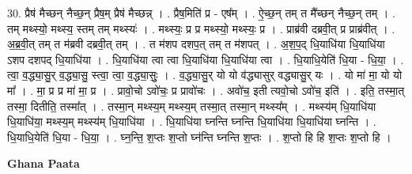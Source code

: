 \documentclass[17pt]{extarticle}
\begin{document}
30. प्रैष॑ मैच्छन् नैच्छ॒न् प्रैष॒म् प्रैष॑ मैच्छन्न् । . प्रैष॒मिति॑ प्र - एष᳚म् । . ऐ॒च्छ॒न् तम् त मै᳚च्छन् नैच्छ॒न् तम् । . तम् मथ्स्यो॒ मथ्स्य॒ स्तम् तम् मथ्स्यः॑ । . मथ्स्यः॒ प्र प्र मथ्स्यो॒ मथ्स्यः॒ प्र । . प्राब्र॑वी दब्रवी॒त् प्र प्राब्र॑वीत् । . अ॒ब्र॒वी॒त् तम् त म॑ब्रवी दब्रवी॒त् तम् । . त म॑शप दशप॒त् तम् त म॑शपत् । . अ॒श॒प॒द् धि॒याधि॑या धि॒याधि॑या ऽशप दशपद् धि॒याधि॑या । . धि॒याधि॑या त्वा त्वा धि॒याधि॑या धि॒याधि॑या त्वा । . धि॒याधि॒येति॑ धि॒या - धि॒या॒ । . त्वा॒ व॒द्ध्या॒सु॒र् व॒द्ध्या॒सु॒ स्त्वा॒ त्वा॒ व॒द्ध्या॒सुः॒ । . व॒द्ध्या॒सु॒र् यो यो व॑द्ध्यासुर् वद्ध्यासु॒र् यः । . यो मा॑ मा॒ यो यो मा᳚ । . मा॒ प्र प्र मा॑ मा॒ प्र । . प्रावो॒चो ऽवो॑चः॒ प्र प्रावो॑चः । . अवो॑च॒ इती त्यवो॒चो ऽवो॑च॒ इति॑ । . इति॒ तस्मा॒त् तस्मा॒ दितीति॒ तस्मा᳚त् । . तस्मा॒न् मथ्स्य॒म् मथ्स्य॒म् तस्मा॒त् तस्मा॒न् मथ्स्य᳚म् । . मथ्स्य॑म् धि॒याधि॑या धि॒याधि॑या॒ मथ्स्य॒म् मथ्स्य॑म् धि॒याधि॑या । . धि॒याधि॑या घ्नन्ति घ्नन्ति धि॒याधि॑या धि॒याधि॑या घ्नन्ति । . धि॒याधि॒येति॑ धि॒या - धि॒या॒ । . घ्न॒न्ति॒ श॒प्तः श॒प्तो घ्न॑न्ति घ्नन्ति श॒प्तः । . श॒प्तो हि हि श॒प्तः श॒प्तो हि । \newline

\textbf{Ghana Paata } \newline
\end{document}
